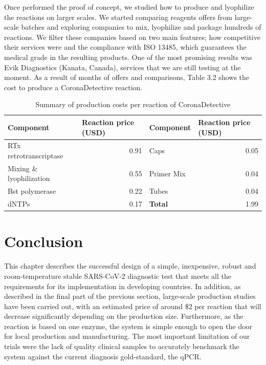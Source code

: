 Once performed the proof of concept, we studied how to produce and lyophilize the reactions on larger scales. We started comparing reagents offers from large-scale batches and exploring companies to mix, lyophilize and package hundreds of reactions. We filter these companies based on two main features; how competitive their services were and the compliance with ISO 13485, which guarantees the medical grade in the resulting products. One of the most promising results was Evik Diagnostics (Kanata, Canada), services that we are still testing at the moment. As a result of months of offers and comparisons, Table 3.2 shows the cost to produce a CoronaDetective reaction.
\begin{table}[]
\begin{center}
\begin{tabular}{lr|lr}
\textbf{Component} & \multicolumn{1}{l|}{\textbf{Reaction price (USD)}} & \textbf{Component} & \multicolumn{1}{l}{\textbf{Reaction price (USD)}} \\ \hline
RTx retrotranscriptase & 0.91 & Caps & 0.05 \\
Mixing \& lyophilization  & 0.55 & Primer Mix & 0.04 \\
Bst polymerase & 0.22 & Tubes & 0.04 \\
dNTPs & 0.17 & \textbf{Total} & 1.99
\end{tabular}
\end{center}
\vspace{10pt}
\caption{Summary of production costs per reaction of CoronaDetective}
\end{table}


\section{Conclusion}
This chapter describes the successful design of a simple, inexpensive, robust and room-temperature stable SARS-CoV-2 diagnostic test that meets all the requirements for its implementation in developing countries. In addition, as described in the final part of the previous section, large-scale production studies have been carried out, with an estimated price of around \$2 per reaction that will decrease significantly depending on the production size. Furthermore, as the reaction is based on one enzyme, the system is simple enough to open the door for local production and manufacturing. The most important limitation of our trials were the lack of quality clinical samples to accurately benchmark the system against the current diagnosis gold-standard, the qPCR.


